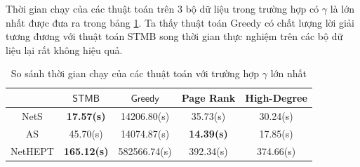 Thời gian chạy của các thuật toán trên 3 bộ dữ liệu trong trường hợp có $\gamma$ là lớn nhất được đưa ra trong bảng \ref{timeSTMB}. Ta thấy thuật toán Greedy có chất lượng lời giải tương đương với thuật toán STMB song thời gian thực nghiệm trên các bộ dữ liệu lại rất không hiệu quả.
\begin{table}[h]
\label{tab:time}       %
\begin{center}
	\begin{tabular}{|c|c|c|c|c|}				
		\hline 
		\textbf{} & {$\mathsf{STMB}$} & {$\mathsf{Greedy}$} & {Page Rank} & {High-Degree} 				
		\\ 
		\hline 
		NetS & \textbf{17.57(s)} &	14206.80(s) &	35.73(s) &	30.24(s)
		\\ 
		\hline 
		AS & 45.70(s) & 14074.87(s) & \textbf{14.39(s)} &	17.85(s)
		\\
		\hline 
		NetHEPT & \textbf{165.12(s)} & 582566.74(s) & 392.34(s) & 374.66(s)
		\\
		\hline 
	\end{tabular}
\end{center}
\caption{So sánh thời gian chạy của các thuật toán với trường hợp $\gamma$ lớn nhất}
\label{timeSTMB}
\end{table}



